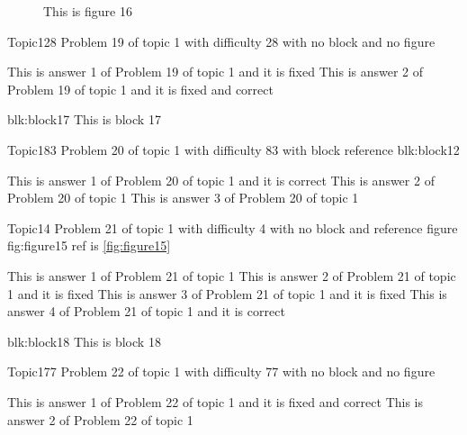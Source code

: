 \documentclass[master]{exam}
\begin{document}
\begin{figure}
	\begin{center}
		This is figure 16 
		\label{fig:figure16}
	\end{center}
\end{figure}

\begin{problem}{Topic1}{28}
	Problem 19 of topic 1 with difficulty 28 with no block and no figure
	\begin{answers}
		\answer[fixed] This is answer 1 of Problem 19 of topic 1 and it is fixed
		 This is answer 2 of Problem 19 of topic 1 and it is fixed and correct
	\end{answers}
\end{problem}



\begin{block}{blk:block17}
This is block 17
\end{block}


\begin{problem}[requires=blk:block12]{Topic1}{83}
	Problem 20 of topic 1 with difficulty 83 with block reference blk:block12
	\begin{answers}
		\answer[correct] This is answer 1 of Problem 20 of topic 1 and it is correct
		\answer This is answer 2 of Problem 20 of topic 1 
		\answer This is answer 3 of Problem 20 of topic 1 
	\end{answers}
\end{problem}

\begin{problem}{Topic1}{4}
	Problem 21 of topic 1 with difficulty 4 with no block and reference figure fig:figure15 ref is \ref{fig:figure15}
	\begin{answers}
		\answer This is answer 1 of Problem 21 of topic 1 
		\answer[fixed] This is answer 2 of Problem 21 of topic 1 and it is fixed
		\answer[fixed] This is answer 3 of Problem 21 of topic 1 and it is fixed
		\answer[correct] This is answer 4 of Problem 21 of topic 1 and it is correct
	\end{answers}
\end{problem}



\begin{block}{blk:block18}
This is block 18
\end{block}


\begin{problem}{Topic1}{77}
	Problem 22 of topic 1 with difficulty 77 with no block and no figure
	\begin{answers}
		 This is answer 1 of Problem 22 of topic 1 and it is fixed and correct
		\answer This is answer 2 of Problem 22 of topic 1 
	\end{answers}
\end{problem}
\end{document}
